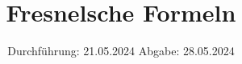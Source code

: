

\subject{V407}
\title{Fresnelsche Formeln}
\date{%
  Durchführung: 21.05.2024
  \hspace{3em}
  Abgabe: 28.05.2024
}



\maketitle
\thispagestyle{empty}
\tableofcontents
\newpage






\printbibliography{}
\appendix
\setcounter{secnumdepth}{0}

